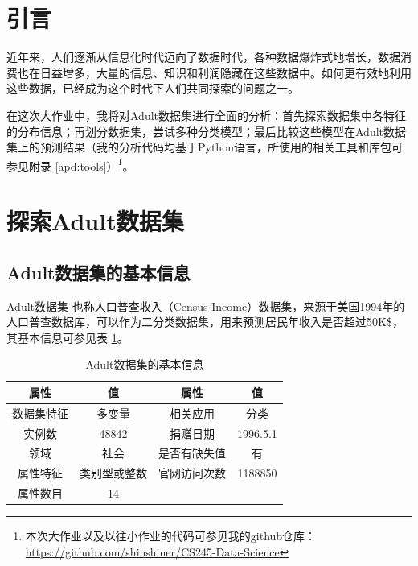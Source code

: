 \documentclass[12pt,a4paper]{article}
\theoremstyle{definition}
\begin{document}
\section{引言}

近年来，人们逐渐从信息化时代迈向了数据时代，各种数据爆炸式地增长，数据消费也在日益增多，大量的信息、知识和利润隐藏在这些数据中。如何更有效地利用这些数据，已经成为这个时代下人们共同探索的问题之一。

\vspace{0.01\linewidth}
在这次大作业中，我将对Adult数据集进行全面的分析：首先探索数据集中各特征的分布信息；再划分数据集，尝试多种分类模型；最后比较这些模型在Adult数据集上的预测结果（我的分析代码均基于Python语言，所使用的相关工具和库包可参见附录 \ref{apd:tools}）\footnote{本次大作业以及以往小作业的代码可参见我的github仓库：\href{https://github.com/shinshiner/CS245-Data-Science}{https://github.com/shinshiner/CS245-Data-Science}}。

\section{探索Adult数据集}

\subsection{Adult数据集的基本信息}

Adult数据集 \cite{Dataset} 也称人口普查收入（Census Income）数据集，来源于美国1994年的人口普查数据库，可以作为二分类数据集，用来预测居民年收入是否超过50K\$，其基本信息可参见表 \ref{tab:basic-info}。

\begin{table}[H]
	\renewcommand\arraystretch{1.35}
	\caption{Adult数据集的基本信息}
	\label{tab:basic-info}
	\centering
	
	\begin{tabular}{c|c||c|c}
		\centering
		属性 & 值 & 属性 & 值 \\
		\hline
		\hline
		数据集特征 & 多变量 & 相关应用 & 分类 \\
		实例数 & 48842 & 捐赠日期 & 1996.5.1 \\
		领域 & 社会 & 是否有缺失值 & 有 \\
		属性特征 & 类别型或整数 & 官网访问次数 & 1188850 \\
		属性数目 & 14 & & \\
		
	\end{tabular}
\end{table}
\end{document}
